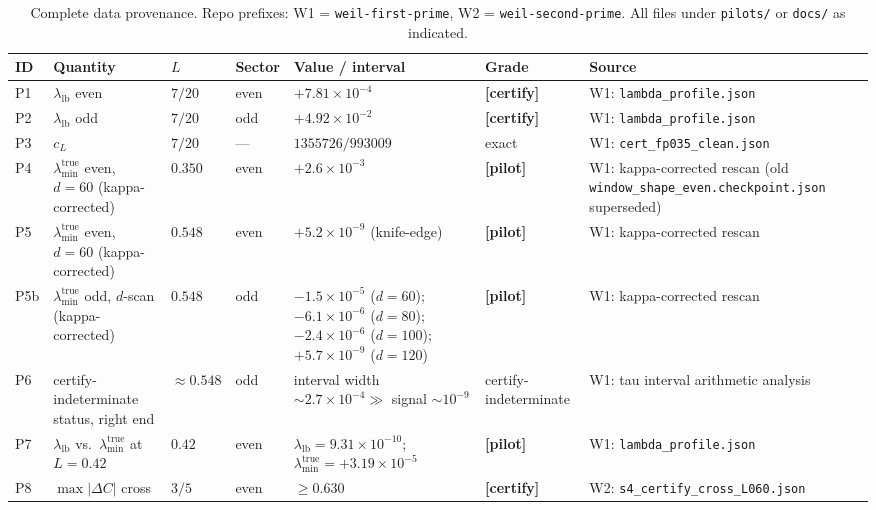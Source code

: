 \documentclass[12pt,a4paper]{amsart}
\theoremstyle{plain}
\theoremstyle{definition}
\newcommand{\ltrue}{\lambda_{\min}^{\mathrm{true}}}
\newcommand{\certify}{\textbf{[certify]}}
\newcommand{\pilot}{\textbf{[pilot]}}
\begin{document}
\begin{table}
\centering
\caption{Complete data provenance.  Repo prefixes: W1 = \texttt{weil-first-prime},
         W2 = \texttt{weil-second-prime}.  All files under \texttt{pilots/} or
         \texttt{docs/} as indicated.}
\label{tab:provenance}
\scriptsize
\begin{tabular}{@{}lp{.22\textheight}lllp{.18\textheight}l@{}}
\toprule
ID & Quantity & $L$ & Sector & Value / interval & Grade & Source \\
\midrule
P1  & $\lambda_{\mathrm{lb}}$ even                          & $7/20$        & even & $+7.81\times10^{-4}$                        & \certify            & W1: \texttt{lambda\_profile.json} \\
P2  & $\lambda_{\mathrm{lb}}$ odd                           & $7/20$        & odd  & $+4.92\times10^{-2}$                        & \certify            & W1: \texttt{lambda\_profile.json} \\
P3  & $c_L$                                                 & $7/20$        & —    & $1355726/993009$                            & exact               & W1: \texttt{cert\_fp035\_clean.json} \\
P4  & $\ltrue$ even, $d=60$ (kappa-corrected)                 & $0.350$       & even & $+2.6\times10^{-3}$                         & \pilot              & W1: kappa-corrected rescan (old \texttt{window\_shape\_even.checkpoint.json} superseded) \\
P5  & $\ltrue$ even, $d=60$ (kappa-corrected)                 & $0.548$       & even & $+5.2\times10^{-9}$ (knife-edge)            & \pilot              & W1: kappa-corrected rescan \\
P5b & $\ltrue$ odd, $d$-scan (kappa-corrected)                 & $0.548$       & odd  & $-1.5\times10^{-5}$ ($d{=}60$); $-6.1\times10^{-6}$ ($d{=}80$); $-2.4\times10^{-6}$ ($d{=}100$); $+5.7\times10^{-9}$ ($d{=}120$) & \pilot & W1: kappa-corrected rescan \\
P6  & certify-indeterminate status, right end                  & ${\approx}0.548$ & odd & interval width ${\sim}2.7\times10^{-4} \gg$ signal ${\sim}10^{-9}$ & certify-indeterminate & W1: tau interval arithmetic analysis \\
P7  & $\lambda_{\mathrm{lb}}$ vs.\ $\ltrue$ at $L{=}0.42$  & $0.42$        & even & $\lambda_{\mathrm{lb}}=9.31\times10^{-10}$; $\ltrue=+3.19\times10^{-5}$ & \pilot & W1: \texttt{lambda\_profile.json} \\
P8  & $\max|\Delta C|$ cross                                & $3/5$         & even & $\ge 0.630$                                 & \certify            & W2: \texttt{s4\_certify\_cross\_L060.json} \\

\end{tabular}
\end{table}
\end{document}
